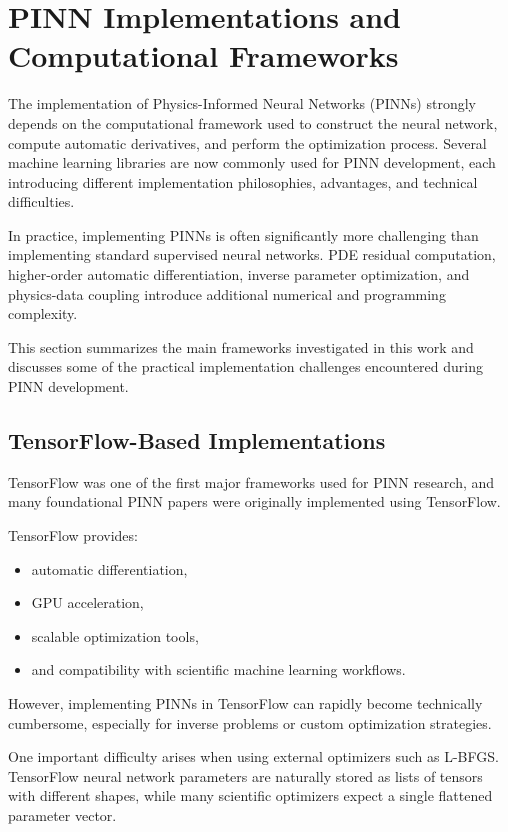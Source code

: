 \section{PINN Implementations and Computational Frameworks}

The implementation of Physics-Informed Neural Networks (PINNs) strongly depends on the computational framework used to construct the neural network, compute automatic derivatives, and perform the optimization process. Several machine learning libraries are now commonly used for PINN development, each introducing different implementation philosophies, advantages, and technical difficulties.

In practice, implementing PINNs is often significantly more challenging than implementing standard supervised neural networks. PDE residual computation, higher-order automatic differentiation, inverse parameter optimization, and physics-data coupling introduce additional numerical and programming complexity.

This section summarizes the main frameworks investigated in this work and discusses some of the practical implementation challenges encountered during PINN development.

\subsection{TensorFlow-Based Implementations}

TensorFlow was one of the first major frameworks used for PINN research, and many foundational PINN papers were originally implemented using TensorFlow.

TensorFlow provides:
\begin{itemize}
    \item automatic differentiation,
    \item GPU acceleration,
    \item scalable optimization tools,
    \item and compatibility with scientific machine learning workflows.
\end{itemize}

However, implementing PINNs in TensorFlow can rapidly become technically cumbersome, especially for inverse problems or custom optimization strategies.

One important difficulty arises when using external optimizers such as L-BFGS. TensorFlow neural network parameters are naturally stored as lists of tensors with different shapes, while many scientific optimizers expect a single flattened parameter vector.

